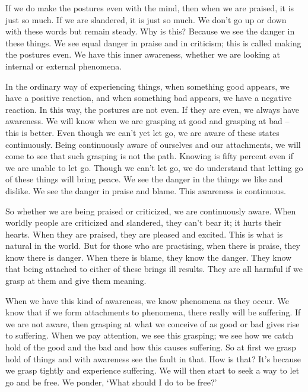If we do make the postures even with the mind, then when we are praised, it is just so much. If we are slandered, it is just so much. We don't go up or down with these words but remain steady. Why is this? Because we see the danger in these things. We see equal danger in praise and in criticism; this is called making the postures even. We have this inner awareness, whether we are looking at internal or external phenomena. 

In the ordinary way of experiencing things, when something good appears, we have a positive reaction, and when something bad appears, we have a negative reaction. In this way, the postures are not even. If they are even, we always have awareness. We will know when we are grasping at good and grasping at bad -- this is better. Even though we can't yet let go, we are aware of these states continuously. Being continuously aware of ourselves and our attachments, we will come to see that such grasping is not the path. Knowing is fifty percent even if we are unable to let go. Though we can't let go, we do understand that letting go of these things will bring peace. We see the danger in the things we like and dislike. We see the danger in praise and blame. This awareness is continuous. 

So whether we are being praised or criticized, we are continuously aware. When worldly people are criticized and slandered, they can't bear it; it hurts their hearts. When they are praised, they are pleased and excited. This is what is natural in the world. But for those who are practising, when there is praise, they know there is danger. When there is blame, they know the danger. They know that being attached to either of these brings ill results. They are all harmful if we grasp at them and give them meaning. 

When we have this kind of awareness, we know phenomena as they occur. We know that if we form attachments to phenomena, there really will be suffering. If we are not aware, then grasping at what we conceive of as good or bad gives rise to suffering. When we pay attention, we see this grasping; we see how we catch hold of the good and the bad and how this causes suffering. So at first we grasp hold of things and with awareness see the fault in that. How is that? It's because we grasp tightly and experience suffering. We will then start to seek a way to let go and be free. We ponder, `What should I do to be free?'  

